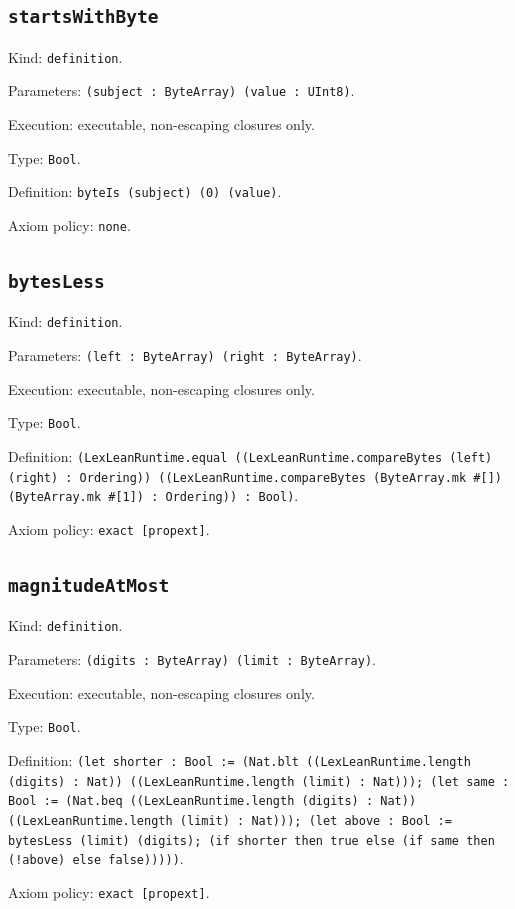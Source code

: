 \documentclass[11pt]{article}
\begin{document}
\subsection*{\texttt{startsWithByte}}
\noindent Kind: \texttt{definition}.\par
\noindent Parameters: \texttt{(subject : ByteArray) (value : UInt8)}.\par
\noindent Execution: executable, non-escaping closures only.\par
\noindent Type: \texttt{Bool}.\par
\noindent Definition: \texttt{byteIs (subject) (0) (value)}.\par
\noindent Axiom policy: \texttt{none}.\par
\subsection*{\texttt{bytesLess}}
\noindent Kind: \texttt{definition}.\par
\noindent Parameters: \texttt{(left : ByteArray) (right : ByteArray)}.\par
\noindent Execution: executable, non-escaping closures only.\par
\noindent Type: \texttt{Bool}.\par
\noindent Definition: \texttt{(LexLeanRuntime.equal ((LexLeanRuntime.compareBytes (left) (right) : Ordering)) ((LexLeanRuntime.compareBytes (ByteArray.mk \#[]) (ByteArray.mk \#[1]) : Ordering)) : Bool)}.\par
\noindent Axiom policy: \texttt{exact [propext]}.\par
\subsection*{\texttt{magnitudeAtMost}}
\noindent Kind: \texttt{definition}.\par
\noindent Parameters: \texttt{(digits : ByteArray) (limit : ByteArray)}.\par
\noindent Execution: executable, non-escaping closures only.\par
\noindent Type: \texttt{Bool}.\par
\noindent Definition: \texttt{(let shorter : Bool := (Nat.blt ((LexLeanRuntime.length (digits) : Nat)) ((LexLeanRuntime.length (limit) : Nat))); (let same : Bool := (Nat.beq ((LexLeanRuntime.length (digits) : Nat)) ((LexLeanRuntime.length (limit) : Nat))); (let above : Bool := bytesLess (limit) (digits); (if shorter then true else (if same then (!above) else false)))))}.\par
\noindent Axiom policy: \texttt{exact [propext]}.\par
\end{document}
